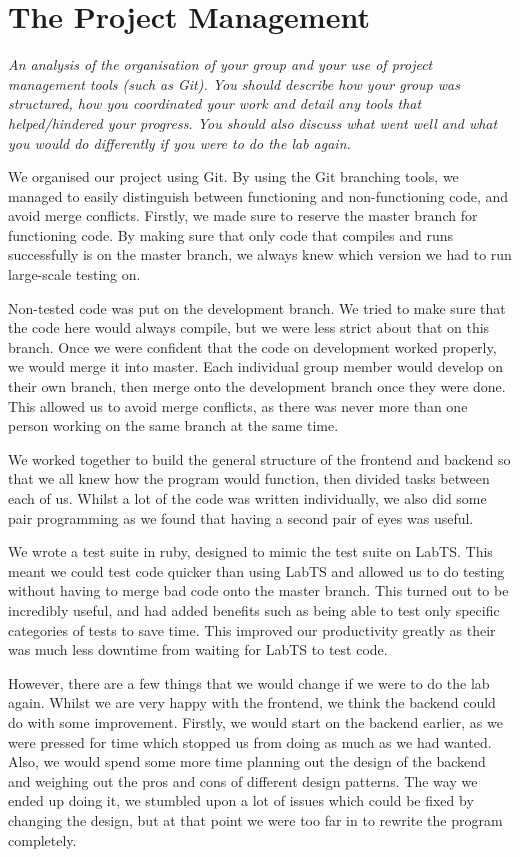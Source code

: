 \documentclass[]{article}
\newcommand{\spec}[1]{\textit{#1}\par\noindent}
\begin{document}
\section{The Project Management}
\spec{An analysis of the organisation of your group and your use of project management tools (such as Git). You should describe how your group was structured, how you coordinated your work and detail any tools that helped/hindered your progress. You should also discuss what went well and what you would do differently if you were to do the lab again.}
We organised our project using Git. By using the Git branching tools, we managed to easily distinguish between functioning and non-functioning code, and avoid merge conflicts. Firstly, we made sure to reserve the master branch for functioning code. By making sure that only code that compiles and runs successfully is on the master branch, we always knew which version we had to run large-scale testing on.

Non-tested code was put on the development branch. We tried to make sure that the code here would always compile, but we were less strict about that on this branch. Once we were confident that the code on development worked properly, we would merge it into master. Each individual group member would develop on their own branch, then merge onto the development branch once they were done. This allowed us to avoid merge conflicts, as there was never more than one person working on the same branch at the same time. 

We worked together to build the general structure of the frontend and backend so that we all knew how the program would function, then divided tasks between each of us. Whilst a lot of the code was written individually, we also did some pair programming as we found that having a second pair of eyes was useful.

We wrote a test suite in ruby, designed to mimic the test suite on LabTS. This meant we could test code quicker than using LabTS and allowed us to do testing without having to merge bad code onto the master branch. This turned out to be incredibly useful, and had added benefits such as being able to test only specific categories of tests to save time. This improved our productivity greatly as their was much less downtime from waiting for LabTS to test code.

However, there are a few things that we would change if we were to do the lab again. Whilst we are very happy with the frontend, we think the backend could do with some improvement. Firstly, we would start on the backend earlier, as we were pressed for time which stopped us from doing as much as we had wanted. Also, we would spend some more time planning out the design of the backend and weighing out the pros and cons of different design patterns. The way we ended up doing it, we stumbled upon a lot of issues which could be fixed by changing the design, but at that point we were too far in to rewrite the program completely.
\end{document}
